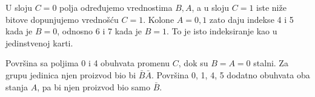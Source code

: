 
U sloju \(C=0\) polja određujemo vrednostima \(B,A\), a u sloju \(C=1\) iste niže bitove dopunjujemo vrednošću \(C=1\). Kolone \(A=0,1\) zato daju indekse 4 i 5 kada je \(B=0\), odnosno 6 i 7 kada je \(B=1\). To je isto indeksiranje kao u jedinstvenoj karti.

Površina sa poljima 0 i 4 obuhvata promenu \(C\), dok su \(B=A=0\) stalni. Za grupu jedinica njen proizvod bio bi \(\bar B\bar A\). Površina 0, 1, 4, 5 dodatno obuhvata oba stanja \(A\), pa bi njen proizvod bio samo \(\bar B\).

